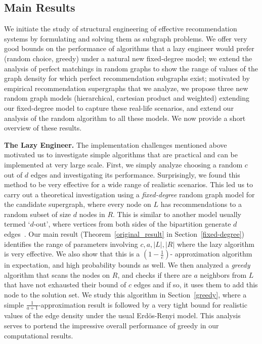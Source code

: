 \subsection{Main Results}
We initiate the study of structural engineering of effective
recommendation systems by formulating and solving them as subgraph
problems. We offer very good bounds on the performance of algorithms
that a lazy engineer would prefer (random choice, greedy) under a
natural new fixed-degree model; we extend the analysis of perfect
matchings in random graphs to show the range of values of the graph
density for which perfect recommendation subgraphs exist; motivated by
empirical recommendation supergraphs that we analyze, we propose three
new random graph models (hierarchical, cartesian product and weighted)
extending our fixed-degree model to capture these real-life scenarios,
and extend our analysis of the random algorithm to all these
models. We now provide a short overview of these results. 


{\bf The Lazy Engineer.} The implementation challenges mentioned above
motivated us to investigate simple algorithms that are practical and can 
be implemented at very large scale. First, we simply analyze choosing a random
$c$ out of $d$ edges and investigating its performance.  Surprisingly,
we found this method to be very effective for a wide range of
realistic scenarios. This led us to carry out a theoretical
investigation using a {\em fixed-degree} random graph model for the
candidate supergraph, where every node on $L$ has recommendations to a
random subset of size $d$ nodes in $R$.  This is similar to another
model usually termed `$d$-out', where vertices from both sides of the
bipartition generate $d$ edges~\cite{FriezePittel2004}. Our main
result (Theorem~\ref{original_result} in Section~\ref{fixed-degree})
identifies the range of parameters involving $c,a,|L|, |R|$ where the
lazy algorithm is very effective. We also show that this is a
$(1-\frac1e)$- approximation algorithm in expectation, and high
probability bounds as well.  We then analyzed a {\em greedy} algorithm
that scans the nodes on $R$, and checks
if there are $a$ neighbors from $L$ that have not exhausted their
bound of $c$ edges and if so, it uses them to add
this node to the solution set. We study this algorithm in
Section~\ref{greedy}, where a simple $\frac{1}{a+1}$-approximation
result is followed by a very tight bound for realistic values of the
edge density under the usual Erd\"os-Renyi
model\cite{ErdosRenyi59}. This analysis serves to portend the
impressive overall performance of greedy in our computational
results. \vs


